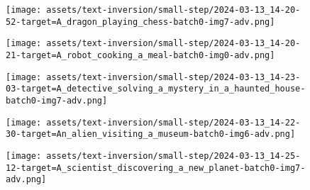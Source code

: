 \begin{figure*}[h]
\vspace{1ex}
\begin{minipage}[t]{.025\textwidth}
     \vspace{0pt}
\end{minipage}%
\hspace{1ex}
\begin{minipage}[t]{0.98\figwidth}
    \vspace{0pt}
    \begin{subfigure}[t]{0.2\textwidth}
        \texttt{[image: assets/text-inversion/small-step/2024-03-13\_14-20-52-target=A\_dragon\_playing\_chess-batch0-img7-adv.png]}
    \end{subfigure}%
    \begin{subfigure}[t]{0.2\textwidth}
        \texttt{[image: assets/text-inversion/small-step/2024-03-13\_14-20-21-target=A\_robot\_cooking\_a\_meal-batch0-img0-adv.png]}
    \end{subfigure}%
    \begin{subfigure}[t]{0.2\textwidth}
        \texttt{[image: assets/text-inversion/small-step/2024-03-13\_14-23-03-target=A\_detective\_solving\_a\_mystery\_in\_a\_haunted\_house-batch0-img7-adv.png]}
    \end{subfigure}%
    \begin{subfigure}[t]{0.2\textwidth}
        \texttt{[image: assets/text-inversion/small-step/2024-03-13\_14-22-30-target=An\_alien\_visiting\_a\_museum-batch0-img6-adv.png]}
    \end{subfigure}%
    \begin{subfigure}[t]{0.2\textwidth}
        \texttt{[image: assets/text-inversion/small-step/2024-03-13\_14-25-12-target=A\_scientist\_discovering\_a\_new\_planet-batch0-img7-adv.png]}
    \end{subfigure}%
\end{minipage}




\end{figure*}
